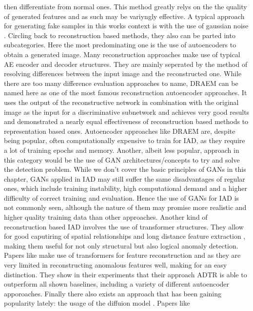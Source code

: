 then differentiate from normal ones. This method greatly relys on the the quality of generated features and as such may be variyngly effective. A typical approach for generating fake samples 
in this works context is with the use of gaussian noise \cite{liu2023simplenet}.
\newline
Circling back to reconstruction based methods, they also can be parted into subcategories. Here the most predominating one is the use of autoencoders to obtain a generated image. Many 
reconstruction approaches make use of typical AE encoder and decoder structures. They are mainly seperated by the method of resolving differences between the input image and the reconstructed one. 
While there are too many difference evaluation approaches to name, DRAEM \cite{Zavrtanik_2021DRAEM} can be named here as one of the most famous reconstruction autoencoder approaches. It uses 
the output of the reconstructive network in combination with the original image as the input for a discriminative subnetwork and achieves very good results and demonstrated a nearly equal effectiveness 
of reconstruction based methods to representation based ones. Autoencoder approaches like DRAEM are, despite being popular, often computationally expensive to train for IAD, as they require a lot of 
training epochs and memory. %
Another, albeit less popular, approach in this category would be the use of GAN architectures/concepts to try and solve the detection problem. While we don't cover the basic principles of GANs in 
this chapter, GANs applied in IAD may still suffer the same disadvantages of regular ones, which include training instability, high computational demand and a higher difficulty of correct training and 
evaluation. Hence the use of GANs for IAD is not commonly seen, although the nature of them may promise more realistic and higher quality training data than other approaches.
Another kind of reconstruction based IAD involves the use of transformer structures. They allow for good caputiring of spatial relationships and long distance feature extraction \cite{xie2020benchmarking},
making them useful for not only structural but also logical anomaly detection. Papers like \cite{You_2023transformer} make use of transformers for feature reconstruction and as they are very 
limited in reconstructing anomalous features well, making for an easy distinction. They show in their experiments that their approach ADTR is able to outperform all shown baselines, including 
a variety of different autoencoder apporoaches.
Finally there also exists an approach that has been gaining popularity lately: the usage of the diffuion model \cite{ho2020denoisingdiffusionOG}. Papers like \cite{Wyatt_2022diffusionfirstapproach} 
